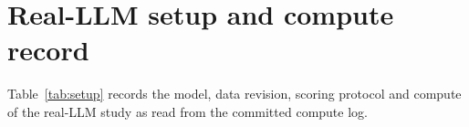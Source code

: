 \section{Real-LLM setup and compute record}\label{app:setup}
Table~\ref{tab:setup} records the model, data revision, scoring protocol and compute of the real-LLM study as read from the committed compute log.
\begin{table}[h]
\centering
\caption{Setup and compute record of the real-LLM study (read from the compute log).}\label{tab:setup}

\par\smallskip\begin{minipage}{.97\linewidth}\footnotesize\end{minipage}
\end{table}
